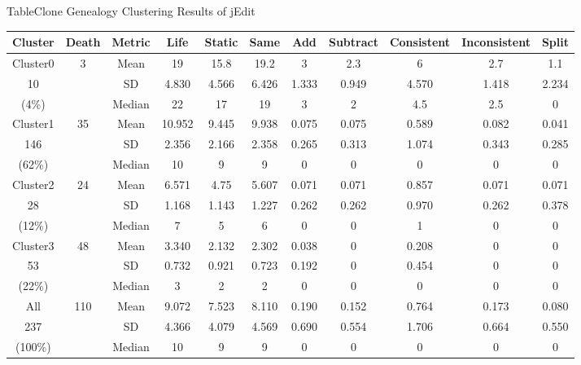 {\begin{table}[htbp]
{Table$\!$}{Clone Genealogy Clustering Results of jEdit}
\vspace{0.5em}
\centering
\footnotesize
\begin{tabular}{ccccccccccc}
\toprule[1.5pt]
Cluster&Death&Metric&Life&	Static&	Same&	Add	&Subtract&	Consistent&	Inconsistent&	Split\\
\midrule[1pt]
Cluster0&\multirow{3}{*}{3}&Mean	&19	&15.8	&19.2	&3	&2.3&	6	&2.7&	1.1\\ 
\cline{3-11}
10&&SD&4.830&4.566&	6.426&1.333&	0.949&	4.570&	1.418&2.234\\ 
\cline{3-11}
(4\%)&&Median	&22&	17&	19&	3&	2	&4.5	&2.5&	0\\ 
\hline
Cluster1&\multirow{3}{*}{35}&Mean	&10.952&	9.445&	9.938&	0.075	&0.075	&0.589&	0.082&	0.041\\ 
\cline{3-11}
146&&SD&2.356&2.166&2.358&0.265	&0.313&	1.074&	0.343&	0.285\\ 
\cline{3-11}
(62\%)&&Median&	10&	9&	9	&0&	0	&0	&0&	0\\ 
\hline
Cluster2&\multirow{3}{*}{24}&Mean	&6.571&	4.75&	5.607&	0.071&	0.071&	0.857&	0.071&	0.071\\ 
\cline{3-11}
28&&SD&1.168&	1.143&1.227&0.262&0.262&0.970&0.262&0.378\\ 
\cline{3-11}
(12\%)&&Median	&7	&5	&6&	0	&0	&1&	0&	0\\ \hline
Cluster3&\multirow{3}{*}{48}&Mean	&3.340&	2.132&	2.302&	0.038&	0	&0.208&	0	&0\\ 
\cline{3-11}
53&&SD&	0.732&0.921&0.723&	0.192&	0&	0.454&0	&0\\ 
\cline{3-11}
(22\%)&&Median	&3&	2&	2	&0&	0&	0	&0&	0\\ \hline
All&\multirow{3}{*}{110}&Mean	&9.072&7.523&	8.110&0.190&	0.152&	0.764	&0.173&	0.080\\ 
\cline{3-11}
237&&SD&4.366&	4.079&4.569&0.690&	0.554&	1.706&0.664	&0.550\\ 
\cline{3-11}
(100\%)&&Median	&10	&9	&9	&0	&0	&0	&0	&0\\
\bottomrule[1.5pt]
\end{tabular}
\end{table}

}
